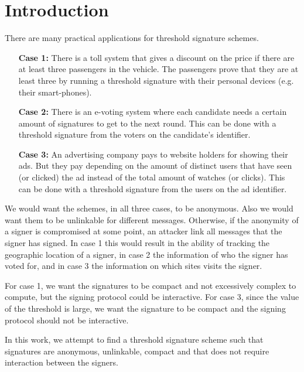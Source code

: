 \chapter{Introduction}

There are many practical applications for threshold signature schemes.

\begin{itemize}[align = left, leftmargin=*, label={--}]
\item[\textbf{Case 1:}] There is a toll system that gives a discount on the price if there are at least three passengers in the vehicle. The passengers prove that they are at least three by running a threshold signature with their personal devices (e.g. their smart-phones).

\item[\textbf{Case 2:}] There is an e-voting system where each candidate needs a certain amount of signatures to get to the next round.  This can be done with a threshold signature from the voters on the candidate's identifier.

\item[\textbf{Case 3:}] An advertising company pays to website holders for showing their ads. But they pay depending on the amount of distinct users that have seen (or clicked) the ad instead of the total amount of watches (or clicks). This can be done with a threshold signature from the users on the ad identifier.
\end{itemize}

We would want the schemes, in all three cases, to be anonymous. Also we would want them to be unlinkable for different messages. Otherwise, if the anonymity of a signer is compromised at some point, an attacker link all messages that the signer has signed. In case 1 this would result in the ability of tracking the geographic location of a signer, in case 2 the information of who the signer has voted for, and in case 3 the information on which sites visits the signer.

For case 1, we want the signatures to be compact and not excessively complex to compute, but the signing protocol could be interactive. For case 3, since the value of the threshold is large, we want the signature to be compact and the signing protocol should not be interactive.

In this work, we attempt to find a threshold signature scheme such that signatures are anonymous, unlinkable, compact and that does not require interaction between the signers.

